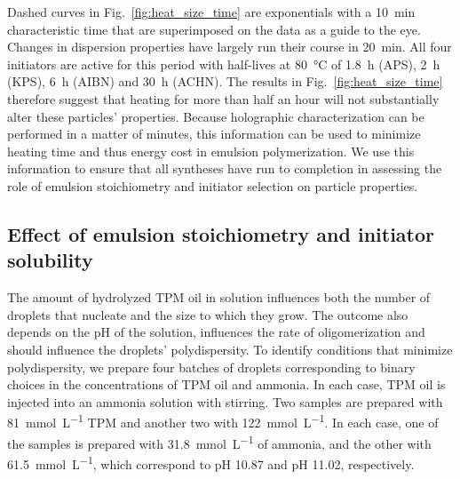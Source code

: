 \documentclass[journal=langd5,manuscript=article,layout=twocolumn]{achemso}
\begin{document}
Dashed curves in Fig.~\ref{fig:heat_size_time}
are exponentials with a \SI{10}{\minute} characteristic
time that are superimposed on the data as a guide
to the eye.
Changes in dispersion properties have largely run
their course in \SI{20}{\minute}.
All four initiators are active for this period with
half-lives at \SI{80}{\degreeCelsius} of \SI{1.8}{\hour} (APS\cite{borisov2015kinetic}),
\SI{2}{\hour} (KPS\cite{beylerian2002kinetics}), 
\SI{6}{\hour} (AIBN) and \SI{30}{\hour}
(ACHN).
The results in Fig.~\ref{fig:heat_size_time} therefore
suggest that heating for more than half an hour
will not substantially alter these particles'
properties.
Because holographic characterization can be performed in a matter of minutes, this
information can be used to minimize heating time
and thus energy cost in emulsion polymerization.
We use this information to ensure that all syntheses
have run to completion in assessing the
role of emulsion stoichiometry and initiator
selection on particle properties.

\subsection{Effect of emulsion stoichiometry and
initiator solubility}
\label{sec:stoichiometry}

The amount of hydrolyzed 
TPM oil in solution influences both
the number of droplets that nucleate and
the size to which they grow.
The outcome also depends on the pH of the solution,
influences the rate of oligomerization and should
influence the droplets' polydispersity.
To identify conditions that minimize polydispersity,
we prepare four batches of droplets
corresponding to binary choices in the
concentrations of TPM oil and ammonia.
In each case, TPM oil is injected into an ammonia solution
with stirring.
Two samples are prepared with \SI{81}{\milli\mole\per\liter}
TPM and another two with \SI{122}{\milli\mole\per\liter}.
In each case, one of the samples is prepared 
with \SI{31.8}{\milli\mole\per\liter} of ammonia,
and the other with \SI{61.5}{\milli\mole\per\liter}, which
correspond to pH \num{10.87} and pH \num{11.02}, respectively.

\end{document}
